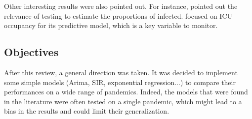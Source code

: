 Other interesting results were also pointed out. 
For instance, \cite{hult2020estimates} pointed out the relevance of testing to estimate the proportions of infected. 
\cite{sjodin2020covid} focused on ICU occupancy for its predictive model, which is a key variable to monitor. 

\subsection{Objectives}

After this review, a general direction was taken. 
It was decided to implement some simple models (Arima, SIR, exponential regression...) to compare their performances on a wide range of pandemics. 
Indeed, the models that were found in the literature were often tested on a single pandemic, which might lead to a bias in the results and could limit their generalization. 

